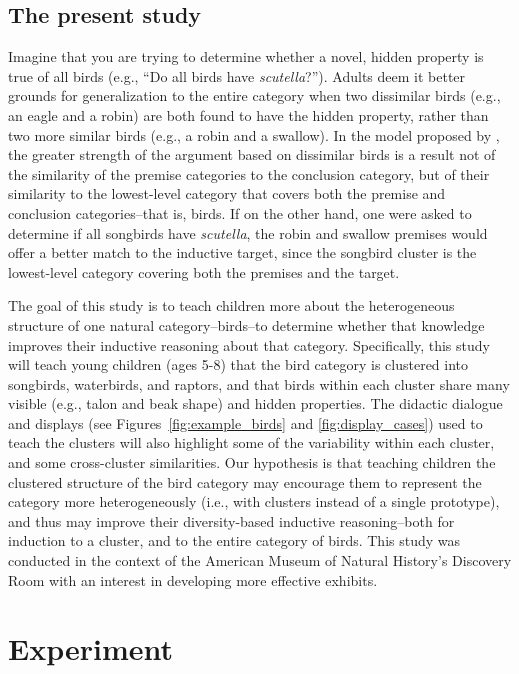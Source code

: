 \documentclass[10pt,letterpaper]{article}
\begin{document}
\subsection{The present study}
Imagine that you are trying to determine whether a novel, hidden property is true of all birds (e.g., ``Do all birds have \emph{scutella}?'').
Adults deem it better grounds for generalization to the entire category when two dissimilar birds (e.g., an eagle and a robin) are both found to have the hidden property, rather than two more similar birds (e.g., a robin and a swallow).
In the model proposed by , the greater strength of the argument based on dissimilar birds is a result not of the similarity of the premise categories to the conclusion category, but of their similarity to the lowest-level category that covers both the premise and conclusion categories--that is, birds.
If on the other hand, one were asked to determine if all songbirds have \emph{scutella}, the robin and swallow premises would offer a better match to the inductive target, since the songbird cluster is the lowest-level category covering both the premises and the target.

The goal of this study is to teach children more about the heterogeneous structure of one natural category--birds--to determine whether that knowledge improves their inductive reasoning about that category.
Specifically, this study will teach young children (ages 5-8) that the bird category is clustered into songbirds, waterbirds, and raptors, and that birds within each cluster share many visible (e.g., talon and beak shape) and hidden properties. 
The didactic dialogue and displays (see Figures~\ref{fig:example_birds} and \ref{fig:display_cases}) used to teach the clusters will also highlight some of the variability within each cluster, and some cross-cluster similarities.
Our hypothesis is that teaching children the clustered structure of the bird category may encourage them to represent the category more heterogeneously (i.e., with clusters instead of a single prototype), and thus may improve their diversity-based inductive reasoning--both for induction to a cluster, and to the entire category of birds.
This study was conducted in the context of the American Museum of Natural History's Discovery Room with an interest in developing more effective exhibits.

\section{Experiment}
\end{document}
